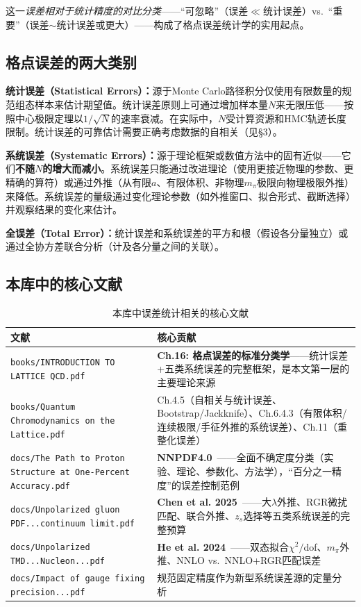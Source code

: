 \documentclass[12pt,a4paper]{ctexart}
\begin{document}
这一\emph{误差相对于统计精度的对比分类}——``可忽略''（误差$\ll$统计误差）vs.\ ``重要''（误差$\sim$统计误差或更大）——构成了格点误差统计学的实用起点。

\subsection{格点误差的两大类别}

\textbf{统计误差（Statistical Errors）：}源于Monte Carlo路径积分仅使用有限数量的规范组态样本来估计期望值。统计误差原则上可通过增加样本量$N$来无限压低——按照中心极限定理以$1/\sqrt{N}$的速率衰减。在实际中，$N$受计算资源和HMC轨迹长度限制。统计误差的可靠估计需要正确考虑数据的自相关（见§3）。

\textbf{系统误差（Systematic Errors）：}源于理论框架或数值方法中的固有近似——它们\textbf{不随$N$的增大而减小}。系统误差只能通过改进理论（使用更接近物理的参数、更精确的算符）或通过外推（从有限$a$、有限体积、非物理$m_\pi$极限向物理极限外推）来降低。系统误差的量级通过变化理论参数（如外推窗口、拟合形式、截断选择）并观察结果的变化来估计。

\textbf{全误差（Total Error）：}统计误差和系统误差的平方和根（假设各分量独立）或通过全协方差联合分析（计及各分量之间的关联）。

\subsection{本库中的核心文献}

\begin{table}[H]
\centering
\caption{本库中误差统计相关的核心文献}
\label{tab:err_papers}
\small
\begin{tabular}{lp{9cm}}
\toprule
\textbf{文献} & \textbf{核心贡献} \\
\midrule
\texttt{books/INTRODUCTION TO LATTICE QCD.pdf}~\cite{Gupta1997intro} &
\textbf{Ch.16: 格点误差的标准分类学}——统计误差+五类系统误差的完整框架，是本文第一层的主要理论来源 \\
\texttt{books/Quantum Chromodynamics on the Lattice.pdf}~\cite{GattringerLang2010} &
Ch.4.5（自相关与统计误差、Bootstrap/Jackknife）、Ch.6.4.3（有限体积/连续极限/手征外推的系统误差）、Ch.11（重整化误差） \\
\texttt{docs/The Path to Proton Structure at One-Percent Accuracy.pdf} &
\textbf{NNPDF4.0}~\cite{NNPDF2021}——全面不确定度分类（实验、理论、参数化、方法学），``百分之一精度''的误差控制范例 \\
\texttt{docs/Unpolarized gluon PDF...continuum limit.pdf} &
\textbf{Chen et al. 2025}~\cite{Chen2025gluon}——大$\lambda$外推、RGR微扰匹配、联合外推、$z_s$选择等五类系统误差的完整预算 \\
\texttt{docs/Unpolarized TMD...Nucleon...pdf} &
\textbf{He et al. 2024}~\cite{He2024unpolTMD}——双态拟合$\chi^2/$dof、$m_\pi$外推、NNLO vs.\ NNLO+RGR匹配误差 \\
\texttt{docs/Impact of gauge fixing precision...pdf} &
规范固定精度作为新型系统误差源的定量分析~\cite{Zhang2024gauge_fixing} \\
\bottomrule
\end{tabular}
\end{table}
\end{document}
